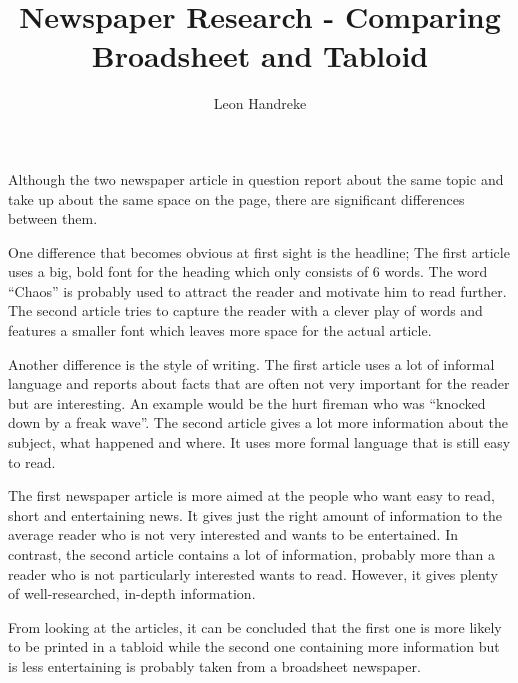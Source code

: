 \documentclass[10pt]{article}
\title{Newspaper Research - Comparing Broadsheet and Tabloid}
\author{Leon Handreke}
\date{}                                           %
\begin{document}
\doublespacing

\maketitle
{}\selectfont

Although the two newspaper article in question report about the same topic and take up about the same space on the page, there are significant differences between them.

One difference that becomes obvious at first sight is the headline; The first article uses a big, bold font for the heading which only consists of 6 words. The word ``Chaos'' is probably used to attract the reader and motivate him to read further. The second article tries to capture the reader with a clever play of words and features a smaller font which leaves more space for the actual article.

Another difference is the style of writing. The first article uses a lot of informal language and reports about facts that are often not very important for the reader but are interesting. An example would be the hurt fireman who was ``knocked down by a freak wave''. The second article gives a lot more information about the subject, what happened and where. It uses more formal language that is still easy to read.

The first newspaper article is more aimed at the people who want easy to read, short and entertaining news. It gives just the right amount of information to the average reader who is not very interested and wants to be entertained. In contrast, the second article contains a lot of information, probably more than a reader who is not particularly interested wants to read. However, it gives plenty of well-researched, in-depth information.

From looking at the articles, it can be concluded that the first one is more likely to be printed in a tabloid while the second one containing more information but is less entertaining is probably taken from a broadsheet newspaper. 
\end{document}
